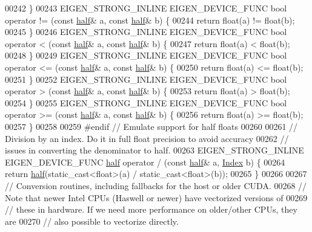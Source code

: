 \begin{DoxyCode}
00242 \}
00243 EIGEN\_STRONG\_INLINE EIGEN\_DEVICE\_FUNC \textcolor{keywordtype}{bool} operator != (\textcolor{keyword}{const} \hyperlink{struct_eigen_1_1half}{half}& a, \textcolor{keyword}{const} 
      \hyperlink{struct_eigen_1_1half}{half}& b) \{
00244   \textcolor{keywordflow}{return} float(a) != float(b);
00245 \}
00246 EIGEN\_STRONG\_INLINE EIGEN\_DEVICE\_FUNC \textcolor{keywordtype}{bool} operator < (\textcolor{keyword}{const} \hyperlink{struct_eigen_1_1half}{half}& a, \textcolor{keyword}{const} 
      \hyperlink{struct_eigen_1_1half}{half}& b) \{
00247   \textcolor{keywordflow}{return} float(a) < float(b);
00248 \}
00249 EIGEN\_STRONG\_INLINE EIGEN\_DEVICE\_FUNC \textcolor{keywordtype}{bool} operator <= (\textcolor{keyword}{const} \hyperlink{struct_eigen_1_1half}{half}& a, \textcolor{keyword}{const} 
      \hyperlink{struct_eigen_1_1half}{half}& b) \{
00250   \textcolor{keywordflow}{return} float(a) <= float(b);
00251 \}
00252 EIGEN\_STRONG\_INLINE EIGEN\_DEVICE\_FUNC \textcolor{keywordtype}{bool} operator > (\textcolor{keyword}{const} \hyperlink{struct_eigen_1_1half}{half}& a, \textcolor{keyword}{const} 
      \hyperlink{struct_eigen_1_1half}{half}& b) \{
00253   \textcolor{keywordflow}{return} float(a) > float(b);
00254 \}
00255 EIGEN\_STRONG\_INLINE EIGEN\_DEVICE\_FUNC \textcolor{keywordtype}{bool} operator >= (\textcolor{keyword}{const} \hyperlink{struct_eigen_1_1half}{half}& a, \textcolor{keyword}{const} 
      \hyperlink{struct_eigen_1_1half}{half}& b) \{
00256   \textcolor{keywordflow}{return} float(a) >= float(b);
00257 \}
00258 
00259 \textcolor{preprocessor}{#endif  // Emulate support for half floats}
00260 
00261 \textcolor{comment}{// Division by an index. Do it in full float precision to avoid accuracy}
00262 \textcolor{comment}{// issues in converting the denominator to half.}
00263 EIGEN\_STRONG\_INLINE EIGEN\_DEVICE\_FUNC \hyperlink{struct_eigen_1_1half}{half} operator / (\textcolor{keyword}{const} \hyperlink{struct_eigen_1_1half}{half}& a, 
      \hyperlink{namespace_eigen_a62e77e0933482dafde8fe197d9a2cfde}{Index} b) \{
00264   \textcolor{keywordflow}{return} \hyperlink{struct_eigen_1_1half}{half}(static\_cast<float>(a) / static\_cast<float>(b));
00265 \}
00266 
00267 \textcolor{comment}{// Conversion routines, including fallbacks for the host or older CUDA.}
00268 \textcolor{comment}{// Note that newer Intel CPUs (Haswell or newer) have vectorized versions of}
00269 \textcolor{comment}{// these in hardware. If we need more performance on older/other CPUs, they are}
00270 \textcolor{comment}{// also possible to vectorize directly.}

\end{DoxyCode}
